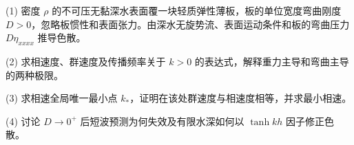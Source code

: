 (1) 密度 \(\rho\) 的不可压无黏深水表面覆一块轻质弹性薄板，板的单位宽度弯曲刚度 \(D>0\)，忽略板惯性和表面张力。由深水无旋势流、表面运动条件和板的弯曲压力 \(D\eta_{xxxx}\) 推导色散。

(2) 求相速度、群速度及传播频率关于 \(k>0\) 的表达式，解释重力主导和弯曲主导的两种极限。

(3) 求相速全局唯一最小点 \(k_*\)，证明在该处群速度与相速度相等，并求最小相速。

(4) 讨论 \(D\to0^+\) 后短波预测为何失效及有限水深如何以 \(\tanh kh\) 因子修正色散。
